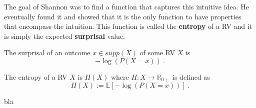 The goal of Shannon was to find a function that captures this intuitive idea. He eventually found it and showed that it is the only function to have properties
that encompass the intuition. This function is called the \textbf{entropy} of a RV and it is simply the expected \textbf{surprisal} value.

\begin{Definition}[Surprisal]
The surprisal of an outcome $ x \in supp(X) $ of some RV $ X $ is
$$ -\log(P(X=x)) \ . $$
\end{Definition} 

\begin{Definition}[Entropy]
The entropy of a RV $ X $ is $ H(X) $ where $ H : X \rightarrow \mathbb{R}_{0+} $ is defined as
$$ H(X) := \mathbb{E}[-\log(P(X=x))] \ . $$
\end{Definition}

bla